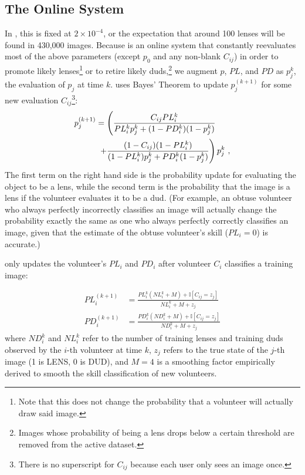 \documentclass[useAMS,usenatbib,a4paper]{mn2e}
\begin{document}
\subsection{The Online System}
\label{sec:formalism:online}
In \sw, this is fixed at $2 \times 10^{-4}$, or the expectation that
around 100 lenses will be found in 430,000 images. Because \sw is an online
system that constantly reevaluates most of the above parameters (except $p_0$
and any non-blank $C_{ij}$) in order to promote likely lenses\footnote{Note
that this does not change the probability that a volunteer will actually draw
said image.} or to retire likely duds,\footnote{Images whose probability of
being a lens drops below a certain threshold are removed from the active
dataset.} we augment $p$, $PL$, and $PD$ as $p_j^k$, the evaluation of
$p_j$ at time $k$. \sw uses Bayes' Theorem to update $p_j^{(k + 1)}$ for
some new evaluation $C_{ij}$\footnote{There is no superscript for $C_{ij}$
because each user only sees an image once.}:
\begin{align}
  p_j^{(k + 1)} &= \left ( \frac{C_{ij} PL_{i}^{k}
  }{PL_{i}^{k} p_j^k + (1 - PD_{i}^{k})(1 -
  p_j^k)}
  \right. \notag \\ & \; \left . +
  \frac{(1 - C_{ij}) (1 - PL_{i}^{k})
  }{(1 - PL_{i}^{k}) p_j^k + PD_{i}^{k}(1 -
  p_j^k)} \right ) p_j^k \ ,
\end{align}
The first term on the right hand side is the probability update for evaluating
the object to be a lens, while the second term is the probability that the
image is a lens if the volunteer evaluates it to be a dud.  (For example, an
obtuse volunteer who always perfectly incorrectly classifies an image will
actually change the probability exactly the same as one who always perfectly
correctly classifies an image, given that the estimate of the obtuse
volunteer's skill ($PL_{i} = 0$) is accurate.)

\sw only updates the volunteer's $PL_{i}$ and $PD_{i}$ after volunteer $C_i$
classifies a training image:

\begin{align}
  PL_{i}^{(k + 1)} &= \frac{PL_{i}^{k} (NL_{i}^{k} + M) + \mathbb{I}[C_{ij} =
  z_{j}]}{NL_{i}^{k} + M + z_{j}} \\
  PD_{i}^{(k + 1)} &= \frac{PD_{i}^{k} (ND_{i}^{k} + M) + \mathbb{I}[C_{ij} =
  z_{j}]}{ND_{i}^{k} + M + z_{j}}
\end{align}
where $ND_{i}^{k}$ and $NL_{i}^{k}$ refer to the number of training lenses and
training duds observed by the $i$-th volunteer at time $k$, $z_{j}$ refers to
the true state of the $j$-th image (1 is LENS, 0 is DUD), and $M = 4$ is a
smoothing factor empirically derived to smooth the skill classification of new
volunteers.
\end{document}
